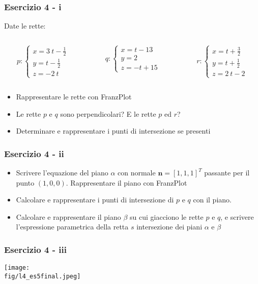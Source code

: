 \documentclass{beamer}
\newcommand{\fig}{./figures} %
\newcommand{\frnzplt}{FranzPlot }
\begin{document}
\begin{frame}
\frametitle{Esercizio 4 - i}
Date le rette:
\begin{columns}

\begin{column}{0.33\textwidth}
\begin{displaymath}
p:\begin{cases} 
x = 3~t - \frac{1}{2}\\
y = t - \frac{1}{2}\\
z = -2~t
\end{cases}
\end{displaymath}
\end{column}
\begin{column}{0.33\textwidth}
\begin{displaymath}
q:\begin{cases} 
x = t - 13 \\
y = 2\\
z = -t + 15
\end{cases}
\end{displaymath}
\end{column}
\begin{column}{0.33\textwidth}
\begin{displaymath}
r:\begin{cases} 
x = t + \frac{3}{2}\\
y = t + \frac{1}{2}\\
z = 2~t -2
\end{cases}
\end{displaymath}
\end{column}
\end{columns}
\begin{itemize}
\item Rappresentare le rette con \frnzplt
\item Le rette $p$ e $q$ sono perpendicolari? E le rette $p$ ed $r$?
\item Determinare e rappresentare i punti di intersezione se presenti
\end{itemize}
\end{frame}
\begin{frame}
\frametitle{Esercizio 4 - ii}
\begin{itemize}
\item Scrivere l'equazione del piano $\alpha$ con normale $\mathbf{n}=[1,1,1]^T$ passante per il punto $(1,0,0)$. Rappresentare il piano con \frnzplt
\item Calcolare  e rappresentare i punti di intersezione di $p$ e $q$ con il piano.
\item Calcolare e rappresentare il piano $\beta$ su cui giacciono  le rette $p$ e $q$, e  scrivere l'espressione parametrica della retta $s$ intersezione dei piani $\alpha$ e $\beta$ 
\end{itemize}
\end{frame}
\begin{frame}
\frametitle{Esercizio 4 - iii}
\begin{center}
\texttt{[image: \\fig/l4\_es5final.jpeg]}
\end{center}
\end{frame}
\end{document}
